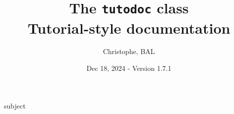 \newcommand\pygmentsREF{\href{https://pygments.org/}{\trademark{Pygments}}}


  {subject }


\newcommand{\FTdirO}{}
\def\FTdirO(#1,#2,#3){%
  \FTfile(#1,{\color{blue!40!black}\faFolderOpen\hspace{-.35pt}}{\hspace{0.2em}#3})
  (tmp.west)++(0.8em,-0.4em)node(#2){}
  (tmp.west)++(1.5em,0)
  ++(0,-1.3em)
}

\newcommand{\FTdirC}{}
\def\FTdirC(#1,#2,#3){%
  \FTfile(#1,{\color{blue!40!black}\faFolder\hspace{.75pt}}{\hspace{0.2em}#3})
  (tmp.west)++(0.8em,-0.4em)node(#2){}
  (tmp.west)++(1.5em,0)
  ++(0,-1.3em)
}

\newcommand{\FTfile}{}
\def\FTfile(#1,#2){%
  node(tmp){}
  (#1|-tmp)++(0.6em,0)
  node(tmp)[anchor=west,black]{\texttt{#2}}
  (#1)|-(tmp.west)
  ++(0,-1.2em)
}

\newcommand{\FTroot}{}
\def\FTroot{tmp.west}

\newcommand\contribtranslatedirtree{
  \begin{tikzpicture}%
    \draw[color=black, thick]
      \FTdirO(\FTroot,root,translate){
        \FTdirC(root,changes,changes){
        }
        \FTdirO(root,en,en) {
          \FTdirC(en,api,api) {
          }
          \FTdirC(en,doc,doc) {
          }
        }
        \FTdirC(root,fr,fr){
        }
        \FTdirC(root,status,status){
          \FTdirO(status,en,en) {
            \FTfile(en,api.yaml)
            \FTfile(en,manual.yaml)
          }
          \FTdirC(status,fr,fr){
          }
        }
        \FTfile(root,README.md)
        \FTfile(root,LICENCE.txt)
      };
  \end{tikzpicture}
}





\title{The \texttt{tutodoc} class \\ Tutorial-style documentation}
\author{Christophe, BAL}
\date{Dec 18, 2024 - Version 1.7.1}

\maketitle


